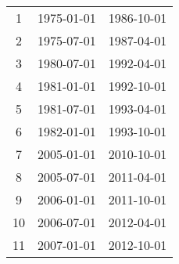 % 
\begin{tabular}{ccc}
  \hline
  \hline
1 & 1975-01-01 & 1986-10-01 \\ 
  2 & 1975-07-01 & 1987-04-01 \\ 
  3 & 1980-07-01 & 1992-04-01 \\ 
  4 & 1981-01-01 & 1992-10-01 \\ 
  5 & 1981-07-01 & 1993-04-01 \\ 
  6 & 1982-01-01 & 1993-10-01 \\ 
  7 & 2005-01-01 & 2010-10-01 \\ 
  8 & 2005-07-01 & 2011-04-01 \\ 
  9 & 2006-01-01 & 2011-10-01 \\ 
  10 & 2006-07-01 & 2012-04-01 \\ 
  11 & 2007-01-01 & 2012-10-01 \\ 
   \hline
\end{tabular}
